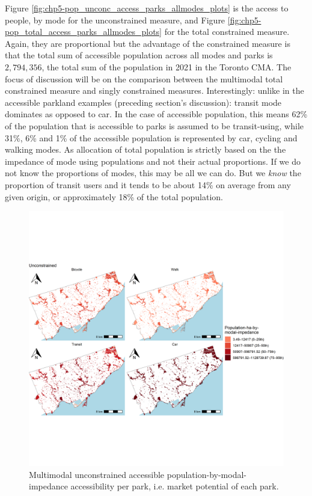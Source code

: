 \documentclass[
11pt, %
oneside, %
english, %
singlespacing, %
]{macthesis} %
\begin{document}
Figure \ref{fig:chp5-pop_unconc_access_parks_allmodes_plots} is the access to people, by mode for the unconstrained measure, and Figure \ref{fig:chp5-pop_total_access_parks_allmodes_plots} for the total constrained measure. Again, they are proportional but the advantage of the constrained measure is that the total sum of accessible population across all modes and parks is \(2,794,356\), the total sum of the population in 2021 in the Toronto CMA. The focus of discussion will be on the comparison between the multimodal total constrained measure and singly constrained measures. Interestingly: unlike in the accessible parkland examples (preceding section's discussion): transit mode dominates as opposed to car. In the case of accessible population, this means 62\% of the population that is accessible to parks is assumed to be transit-using, while 31\%, 6\% and 1\% of the accessible population is represented by car, cycling and walking modes. As allocation of total population is strictly based on the the impedance of mode using populations and not their actual proportions. If we do not know the proportions of modes, this may be all we can do. But we \emph{know} the proportion of transit users and it tends to be about 14\% on average from any given origin, or approximately 18\% of the total population.

\begin{figure}

{\centering \includegraphics[width=6in]{./data/figures/chp5-pop_unconc_access_parks_allmodes_plots} 

}

\caption{\label{fig:chp5-pop_unconc_access_parks_allmodes_plots} Multimodal unconstrained accessible population-by-modal-impedance accessibility per park, i.e. market potential of each park.}\label{fig:unnamed-chunk-88}
\end{figure}
\end{document}
